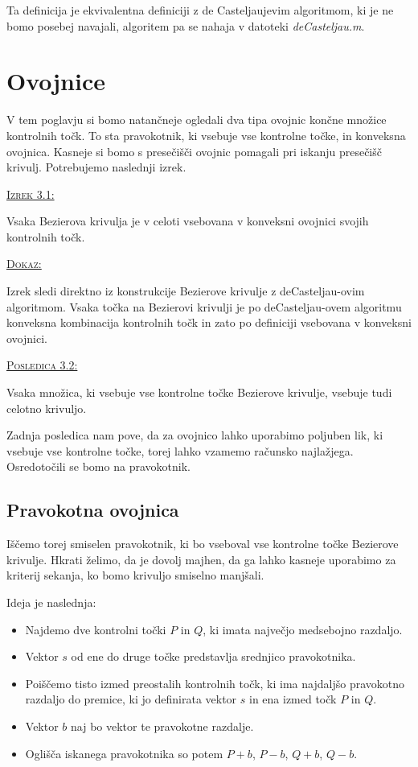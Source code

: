 \documentclass[a4paper, 12pt]{article} %
\newenvironment{matematika}[1]{
{\underline{\textsc{#1:}}}
}{
}
\begin{document}
Ta definicija je ekvivalentna definiciji z de Casteljaujevim algoritmom, ki je ne bomo posebej navajali, algoritem pa se nahaja v datoteki \emph{deCasteljau.m}.
\section{Ovojnice}

V tem poglavju si bomo natančneje ogledali dva tipa ovojnic končne množice kontrolnih točk. To sta pravokotnik, ki vsebuje vse kontrolne točke, in konveksna ovojnica. Kasneje si bomo s presečišči ovojnic pomagali pri iskanju presečišč krivulj. Potrebujemo naslednji izrek.

\begin{matematika}{Izrek 3.1}
Vsaka Bezierova krivulja je v celoti vsebovana v konveksni ovojnici svojih kontrolnih točk.
\end{matematika}

\begin{matematika}{Dokaz}
Izrek sledi direktno iz konstrukcije Bezierove krivulje z deCasteljau-ovim algoritmom. Vsaka točka na Bezierovi krivulji je po deCasteljau-ovem algoritmu konveksna kombinacija kontrolnih točk in zato po definiciji vsebovana v konveksni ovojnici.
\end{matematika}

\begin{matematika}{Posledica 3.2}
Vsaka množica, ki vsebuje vse kontrolne točke Bezierove krivulje, vsebuje tudi celotno krivuljo.
\end{matematika}

Zadnja posledica nam pove, da za ovojnico lahko uporabimo poljuben lik, ki vsebuje vse kontrolne točke, torej lahko vzamemo računsko najlažjega. Osredotočili se bomo na pravokotnik.

\subsection{Pravokotna ovojnica}
Iščemo torej smiselen pravokotnik, ki bo vseboval vse kontrolne točke Bezierove krivulje. Hkrati želimo, da je dovolj majhen, da ga lahko kasneje uporabimo za kriterij sekanja, ko bomo krivuljo smiselno manjšali.

Ideja je naslednja:
\begin{itemize}
\item Najdemo dve kontrolni točki $P$ in $Q$, ki imata največjo medsebojno razdaljo.
\item Vektor $s$ od ene do druge točke predstavlja srednjico pravokotnika.
\item Poiščemo tisto izmed preostalih kontrolnih točk, ki ima najdaljšo pravokotno razdaljo do premice, ki jo definirata vektor $s$ in ena izmed točk $P$ in $Q$.
\item Vektor $b$ naj bo vektor te pravokotne razdalje.
\item Oglišča iskanega pravokotnika so potem $P + b$, $P - b$, $Q + b$, $Q - b$.
\end{itemize}
\end{document}
